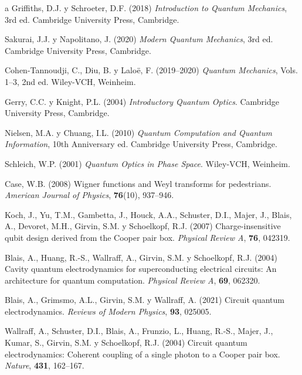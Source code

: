 \documentclass[11pt,a4paper,spanish]{book}
\begin{document}
\begin{thebibliography}{a}
		 Griffiths, D.J. y Schroeter, D.F. (2018) \emph{Introduction to Quantum Mechanics}, 3rd ed. Cambridge University Press, Cambridge.
		
		 Sakurai, J.J. y Napolitano, J. (2020) \emph{Modern Quantum Mechanics}, 3rd ed. Cambridge University Press, Cambridge.
		
		 Cohen-Tannoudji, C., Diu, B. y Laloë, F. (2019--2020) \emph{Quantum Mechanics}, Vols. 1--3, 2nd ed. Wiley-VCH, Weinheim.
		
		 Gerry, C.C. y Knight, P.L. (2004) \emph{Introductory Quantum Optics}. Cambridge University Press, Cambridge.
		
		 Nielsen, M.A. y Chuang, I.L. (2010) \emph{Quantum Computation and Quantum Information}, 10th Anniversary ed. Cambridge University Press, Cambridge.
		
		 Schleich, W.P. (2001) \emph{Quantum Optics in Phase Space}. Wiley-VCH, Weinheim.
		
		 Case, W.B. (2008) Wigner functions and Weyl transforms for pedestrians. \textit{American Journal of Physics}, \textbf{76}(10), 937--946.
		
		
		 Koch, J., Yu, T.M., Gambetta, J., Houck, A.A., Schuster, D.I., Majer, J., Blais, A., Devoret, M.H., Girvin, S.M. y Schoelkopf, R.J. (2007) Charge-insensitive qubit design derived from the Cooper pair box. \textit{Physical Review A}, \textbf{76}, 042319.
		
		 Blais, A., Huang, R.-S., Wallraff, A., Girvin, S.M. y Schoelkopf, R.J. (2004) Cavity quantum electrodynamics for superconducting electrical circuits: An architecture for quantum computation. \textit{Physical Review A}, \textbf{69}, 062320.
		
		 Blais, A., Grimsmo, A.L., Girvin, S.M. y Wallraff, A. (2021) Circuit quantum electrodynamics. \textit{Reviews of Modern Physics}, \textbf{93}, 025005.
		
		 Wallraff, A., Schuster, D.I., Blais, A., Frunzio, L., Huang, R.-S., Majer, J., Kumar, S., Girvin, S.M. y Schoelkopf, R.J. (2004) Circuit quantum electrodynamics: Coherent coupling of a single photon to a Cooper pair box. \textit{Nature}, \textbf{431}, 162--167.
		

\end{thebibliography}
\end{document}

